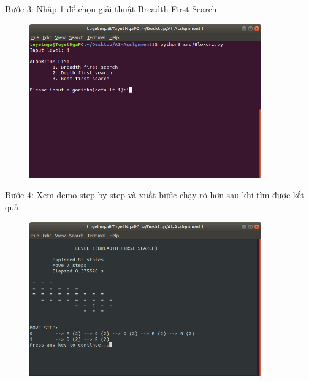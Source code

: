 \documentclass[11pt,a4paper]{article}
\begin{document}
\newpage
\begin{flushleft}
	\hspace{3 cm} Bước 3: Nhập 1 để chọn giải thuật Breadth First Search
\end{flushleft}
\begin{center}
	\begin{figure}[htp]
		\begin{center}
			\includegraphics[width=10cm]{Images/breadth1.png}
		\end{center}
		\caption{\label{fig:breadth1}}
	\end{figure}
\end{center}
\begin{flushleft}
	\hspace{2 cm}	Bước 4: Xem demo step-by-step và xuất bước chạy rõ hơn sau khi tìm được kết quả
\end{flushleft}
\begin{center}
	\begin{figure}[htp]
		\begin{center}
			\includegraphics[width=10cm]{Images/breadth3.png}
		\end{center}
		\caption{\label{fig:breadth3}}
	\end{figure}
\end{center}
\newpage
\end{document}
